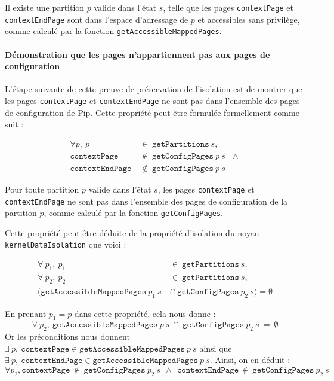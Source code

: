 			\begin{theorem}
				Il existe une partition $p$ valide dans l'état $s$, telle que les pages \texttt{contextPage} et \texttt{contextEndPage} sont dans l'espace d'adressage de $p$ et accessibles sans privilège, comme calculé par la fonction \texttt{getAccessibleMappedPages}.
			\end{theorem}

			\paragraph{Démonstration que les pages n'appartiennent pas aux pages de configuration}

			L'étape suivante de cette preuve de préservation de l'isolation est de montrer que les pages \texttt{contextPage} et \texttt{contextEndPage} ne sont pas dans l'ensemble des pages de configuration de Pip. Cette propriété peut être formulée formellement comme suit :

			\begin{align*}
				\forall p,~p~&\in~\mathtt{getPartitions}~s,\\
				\mathtt{contextPage}~&\notin~\mathtt{getConfigPages}~p~s~~~\wedge\\
				\mathtt{contextEndPage}~&\notin~\mathtt{getConfigPages}~p~s
			\end{align*}

			\begin{theorem}
				Pour toute partition $p$ valide dans l'état $s$, les pages \texttt{contextPage} et \texttt{contextEndPage} ne sont pas dans l'ensemble des pages de configuration de la partition $p$, comme calculé par la fonction \texttt{getConfigPages}.
			\end{theorem}

			Cette propriété peut être déduite de la propriété d'isolation du noyau \texttt{kernelDataIsolation} que voici :

			\begin{align*}
				\forall~p_1,~p_1~&\in~\mathtt{getPartitions}~s,\\
				\forall~p_2,~p_2~&\in~\mathtt{getPartitions}~s,\\
				(\mathtt{getAccessibleMappedPages}~p_1~s~&\cap~\mathtt{getConfigPages}~p_2~s) = \emptyset
			\end{align*}

			En prenant $p_1 = p$ dans cette propriété, cela nous donne : 
			$$\forall~p_2,~\mathtt{getAccessibleMappedPages}~p~s~\cap~\mathtt{getConfigPages}~p_2~s~=~\emptyset$$
			Or les préconditions nous donnent $\exists~p,~\mathtt{contextPage} \in \mathtt{getAccessibleMappedPages}~p~s$ ainsi que $\exists~p,~\mathtt{contextEndPage} \in \mathtt{getAccessibleMappedPages}~p~s$. Ainsi, on en déduit :
			$$\forall p_2, \mathtt{contextPage}~\notin~\mathtt{getConfigPages}~p_2~s~~\wedge~~\mathtt{contextEndPage}~\notin~\mathtt{getConfigPages}~p_2~s$$


